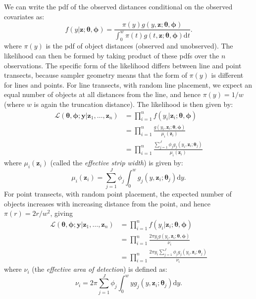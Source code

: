 \documentclass[10pt]{article}
\begin{document}
We can write the pdf of the observed distances conditional on the observed covariates as\cite{Buckland:2004ts}:
\begin{equation*}
f(y \vert \mathbf{z}; \mathbf{\theta}, \mathbf{\phi}) = \frac{\pi(y)g(y, \mathbf{z}; \mathbf{\theta}, \mathbf{\phi})}{\int_0^w \pi(t)g(t, \mathbf{z}; \mathbf{\theta}, \mathbf{\phi}) \text{d}t}.
\end{equation*}
where $\pi(y)$ is the pdf of object distances (observed and unobserved). The likelihood can then be formed by taking product of these pdfs over the $n$ observations.  The specific form of the likelihood differs between line and point transects, because sampler geometry means that the form of $\pi(y)$ is different for lines and points.  For line transects, with random line placement, we expect an equal number of objects at all distances from the line, and hence $\pi(y)=1/w$ (where $w$ is again the truncation distance).  The likelihood is then given by:
\begin{align*}
\mathcal{L}(\mathbf{\theta},\mathbf{\phi}; \mathbf{y} \vert \mathbf{z}_1, \ldots, \mathbf{z}_n) &= \prod_{i=1}^n f(y_i \vert \mathbf{z}_i; \mathbf{\theta},\mathbf{\phi})\\
&= \prod_{i=1}^n \frac{g(y_i,\mathbf{z}_i; \mathbf{\theta},\mathbf{\phi})}{\mu_i(\mathbf{z}_i)}\\
&= \prod_{i=1}^n \frac{\sum_{j=1}^J \phi_j g_j(y_i,\mathbf{z}_i; \mathbf{\theta}_j)}{\mu_i(\mathbf{z}_i)}
\end{align*}
where $\mu_i(\mathbf{z}_i)$ (called the \textit{effective strip width}) is given by:
\begin{equation}
\label{e:esw}
\mu_{i}(\mathbf{z}_i) = \sum_{j=1}^J \phi_j \int_0^w  g_j(y,\mathbf{z}_i; \mathbf{\theta}_j) \text{d}y.
\end{equation}
For point transects, with random point placement, the expected number of objects increases with increasing distance from the point, and hence $\pi(r)=2r/w^2$, giving
\begin{align*}
\mathcal{L}(\mathbf{\theta},\mathbf{\phi}; \mathbf{y}  \vert \mathbf{z}_1, \ldots, \mathbf{z}_n) &= \prod_{i=1}^n f(y_i \vert \mathbf{z}_i; \mathbf{\theta},\mathbf{\phi})\\
&= \prod_{i=1}^n \frac{2 \pi y_i g(y_i,\mathbf{z}_i; \mathbf{\theta},\mathbf{\phi})}{\nu_i}\\
&= \prod_{i=1}^n \frac{2 \pi y_i \sum_{j=1}^J \phi_j g_j(y_i,\mathbf{z}_i; \mathbf{\theta}_j)}{\nu_i}
\end{align*}
where $\nu_i$ (the \textit{effective area of detection}) is defined as:
\begin{equation}
\label{e:ead}
\nu_i = 2\pi \sum_{j=1}^J \phi_j \int_0^w  y g_j(y,\mathbf{z}_i; \mathbf{\theta}_j) \text{d}y.
\end{equation}
\end{document}
